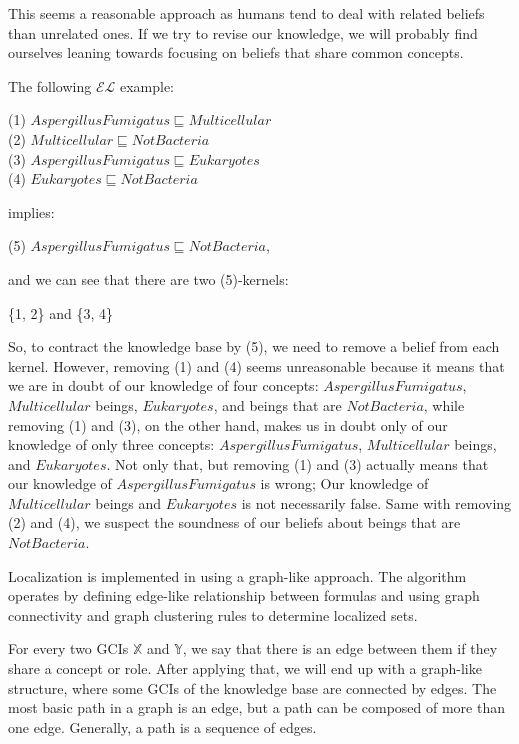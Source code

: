 This seems a reasonable approach as humans tend to deal with related beliefs than unrelated ones. If we try to revise our knowledge, we will probably find ourselves leaning towards focusing on beliefs that share common concepts. 

The following $\mathcal{EL}$ example:
\begin{center}
(1) $AspergillusFumigatus \sqsubseteq Multicellular $ \\
(2) $Multicellular \sqsubseteq NotBacteria$ \\
(3) $AspergillusFumigatus \sqsubseteq Eukaryotes$ \\
(4) $Eukaryotes \sqsubseteq NotBacteria$ 
\end{center}
implies:
\begin{center}
(5) $AspergillusFumigatus \sqsubseteq NotBacteria$,
\end{center}
and we can see that there are two (5)-kernels:
\begin{center}
\{1, 2\} and \{3, 4\}
\end{center}

So, to contract the knowledge base by (5), we need to remove a belief from each kernel. However, removing (1) and (4) seems unreasonable because it means that we are in doubt of our knowledge of four concepts: $AspergillusFumigatus$, $Multicellular$ beings, $Eukaryotes$, and beings that are $NotBacteria$, while removing (1) and (3), on the other hand, makes us in doubt only of our knowledge of only three concepts: $AspergillusFumigatus$, $Multicellular$ beings, and $Eukaryotes$. Not only that, but removing (1) and (3) actually means that our knowledge of $AspergillusFumigatus$ is wrong; Our knowledge of $Multicellular$ beings and $Eukaryotes$ is not necessarily false. Same with removing (2) and (4), we suspect the soundness of our beliefs about beings that are $NotBacteria$.

Localization is implemented in \cite{zwei} using a graph-like approach. The algorithm operates by defining edge-like relationship between formulas and using graph connectivity and graph clustering rules to determine localized sets. 

For every two GCIs $\mathbb{X}$ and $\mathbb{Y}$, we say that there is an edge between them if they share a concept or role.
After applying that, we will end up with a graph-like structure, where some GCIs of the knowledge base are connected by edges. The most basic path in a graph is an edge, but a path can be composed of more than one edge. Generally, a path is a sequence of edges.

